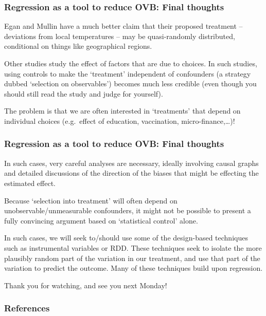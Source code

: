 \documentclass[12pt,english,dvipsnames,aspectratio=169,handout]{beamer}\usepackage[]{graphicx}\usepackage[]{xcolor}
\begin{document}
\begin{frame}
\frametitle{Regression as a tool to reduce OVB: Final thoughts}

\footnotesize
Egan and Mullin \citeyear{egan_turning_2012} have a much better claim that their proposed treatment -- deviations from local temperatures -- may be quasi-randomly distributed, conditional on things like geographical regions.

Other studies study the effect of factors that are due to choices. In such studies, using controls to make the `treatment' independent of confounders  (a strategy dubbed `selection on observables') becomes much less credible (even though you should still read the study and judge for yourself).

The problem is that we are often interested in `treatments' that depend on individual choices (e.g.\ effect of education, vaccination, micro-finance,\ldots)!

\end{frame}


\begin{frame}
\frametitle{Regression as a tool to reduce OVB: Final thoughts}

\footnotesize
In such cases, very careful analyses are necessary, ideally involving causal graphs and detailed discussions of the direction of the biases that might be effecting the estimated effect.

Because `selection into treatment' will often depend on unobservable/unmeasurable confounders, it might not be possible to present a fully convincing argument based on `statistical control' alone.

In such cases, we will seek to/should use some of the design-based techniques such as instrumental variables or RDD. These techniques seek to isolate the more plausibly random part of the variation in our treatment, and use that part of the variation to predict the outcome. Many of these techniques build upon regression.

\end{frame}

\begin{frame}
\begin{center}
    \LARGE Thank you for watching, and see you next Monday!
\end{center}
\end{frame}


\begin{frame}
\frametitle{References}


\vspace{5cm}
\end{frame}
\end{document}
